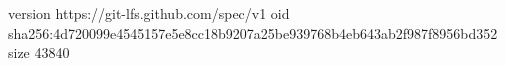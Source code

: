 version https://git-lfs.github.com/spec/v1
oid sha256:4d720099e4545157e5e8cc18b9207a25be939768b4eb643ab2f987f8956bd352
size 43840
